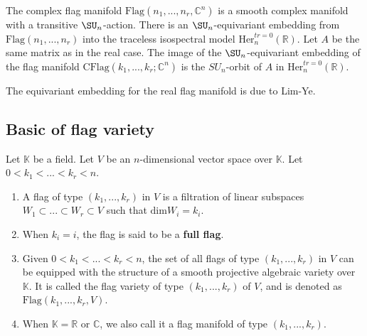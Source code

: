 \documentclass[a4paper]{amsart}
\newcommand{\RO}{{\mathrm {O}}} \newcommand{\RP}{{\mathrm {P}}}
\newcommand{\RU}{{\mathrm {U}}} \newcommand{\RV}{{\mathrm {V}}}
\newcommand{\Flag}{\mathrm{Flag}}
\newcommand{\CFlag}{\mathrm{CFlag}}
\newcommand{\SO}{{\mathrm{SO}}}\newcommand{\so}{\mathfrak{so}}
\theoremstyle{plain}
\newtheorem{lem}[thm]{Lemma}
\theoremstyle{remark} \newtheorem{remark}[thm]{Remark}
\theoremstyle{remark} \newtheorem{exercise}{Exercise}
\theoremstyle{remark} \newtheorem{example}{Example}
\numberwithin{equation}{section}
\begin{document}
The complex flag manifold $\Flag(n_1,...,n_r,\mathbb{C}^n)$ is a smooth complex manifold 
with a transitive $\SU_n$-action. 
There is an $\SU_n$-equivariant embedding from $\Flag(n_1,...,n_r)$ into the traceless isospectral model $\text{Her}_n^{tr=0}(\mathbb{R}).$ Let $A$ be the same matrix as in the real case.
The image of the $\SU_n$-equivariant embedding of the flag manifold $\CFlag(k_1,...,k_r;\mathbb{C}^n)$ is the $SU_n$-orbit of $A$ in $\text{Her}_n^{tr=0}(\mathbb{R}).$

The equivariant embedding for the real flag manifold is due to Lim-Ye. 
\subsection{Basic of flag variety}
\begin{defn}\label{real flag}
	Let $\mathbb{K}$ be a field. Let $V$ be an $n$-dimensional vector space over $\mathbb{K}$. Let $0<k_1<...<k_r<n$. 
    \begin{enumerate}
    \item A flag of type $(k_1,...,k_r)$ in $V$ is a filtration of linear subspaces $W_1\subset ... \subset W_r\subset V$ such that $\text{dim}W_i=k_i.$ %
    \item When $k_i=i$, the flag is said to be a \textbf{full flag}.

    \item Given $0<k_1<...<k_r<n$, the set of all flags of type $(k_1,...,k_r)$ in $V$ can be equipped with the structure of a smooth projective algebraic variety over $\mathbb{K}$. It is called the flag variety of type $(k_1,...,k_r)$ of $V$, and is denoted as $\text{Flag}(k_1,...,k_r, V)$. %
    \item When $\mathbb{K}=\mathbb{R}$ or $\mathbb{C}$, we also call it a flag manifold of type $(k_1,...,k_r)$.
    \end{enumerate}
\end{defn}
\end{document}

